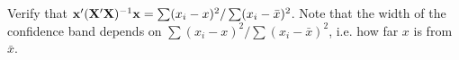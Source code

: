 Verify that $\mathbf{x}'(\mathbf{X}'\mathbf{X})^{-1}\mathbf{x}=
\sum(x_i-x)^2/\sum(x_i-\bar{x})^2$.  Note that the width of the
confidence band depends on $\sum(x_i-x)^2/\sum(x_i-\bar{x})^2$,
i.e. how far $x$ is from $\bar{x}$.
\eexa
%
%
%
%
%
%
